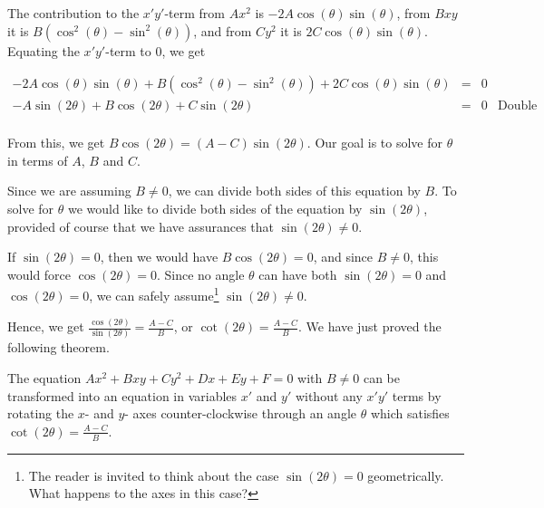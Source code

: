 \documentclass{ximera}
\begin{document}
The contribution to the $x'y'$-term from $Ax^2$ is $-2A\cos(\theta) \sin(\theta)$, from $Bxy$ it is $B \left(\cos^{2}(\theta)-\sin^2(\theta)\right)$, and from $Cy^2$ it is $2C \cos(\theta) \sin(\theta)$.  Equating the $x'y'$-term to $0$, we get

\[ \begin{array}{rcll}

-2A\cos(\theta) \sin(\theta) + B \left(\cos^{2}(\theta)-\sin^2(\theta)\right) + 2C \cos(\theta) \sin(\theta) & = & 0 & \\  
-A \sin(2\theta) + B \cos(2\theta) + C \sin(2\theta) & = & 0 & \text{Double Angle Identities} \\  
\end{array} \]

From this, we get $B \cos(2\theta) = (A-C)\sin(2\theta)$. Our goal is to solve for $\theta$ in terms of  $A$, $B$ and $C$. 

 

 Since we are assuming $B \neq 0$, we can divide both sides of this equation by $B$.  To solve for $\theta$ we would like to divide both sides of the equation by $\sin(2\theta)$, provided of course that  we have assurances that $\sin(2\theta) \neq 0$.  
 
  
 
 If  $\sin(2\theta) = 0$, then we would have  $B \cos(2\theta) = 0$, and since $B \neq 0$, this would force $\cos(2\theta) = 0$.  Since no angle $\theta$ can have both $\sin(2\theta) = 0$ and $\cos(2\theta) = 0$, we can safely assume\footnote{The reader is invited to think about the case $\sin(2\theta) = 0$ geometrically.  What happens to the axes in this case?} $\sin(2\theta) \neq 0$.  
 
  
 
Hence, we get $\frac{\cos(2\theta)}{\sin(2\theta)} = \frac{A-C}{B}$, or $\cot(2\theta) = \frac{A-C}{B}$.  We have just proved the following theorem.

  

\begin{theorem} \label{rotatedconicthm}  The equation  $Ax^2 + Bxy +Cy^2 + Dx + Ey + F = 0$ with $B \neq 0$ can be transformed into an equation in variables $x'$ and $y'$ without any $x'y'$ terms by rotating the $x$- and $y$- axes counter-clockwise through an angle $\theta$ which satisfies $\cot(2\theta) = \frac{A-C}{B}$.

\end{theorem}

  
\end{document}
